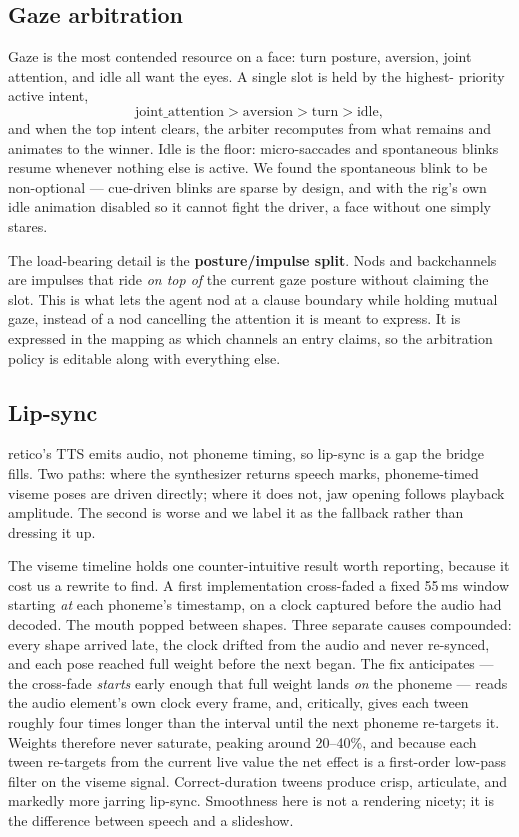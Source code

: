 \documentclass[conference]{IEEEtran}
\begin{document}
\subsection{Gaze arbitration}
\label{sec:arbitration}

Gaze is the most contended resource on a face: turn posture, aversion, joint
attention, and idle all want the eyes. A single slot is held by the highest-
priority active intent,
\[
  \textrm{joint\_attention} > \textrm{aversion} > \textrm{turn} > \textrm{idle},
\]
and when the top intent clears, the arbiter recomputes from what remains and
animates to the winner. Idle is the floor: micro-saccades and spontaneous blinks
resume whenever nothing else is active. We found the spontaneous blink to be
non-optional --- cue-driven blinks are sparse by design, and with the rig's own
idle animation disabled so it cannot fight the driver, a face without one simply
stares.

The load-bearing detail is the \textbf{posture/impulse split}. Nods and
backchannels are impulses that ride \emph{on top of} the current gaze posture
without claiming the slot. This is what lets the agent nod at a clause boundary
while holding mutual gaze, instead of a nod cancelling the attention it is meant
to express. It is expressed in the mapping as which channels an entry claims, so
the arbitration policy is editable along with everything else.

\subsection{Lip-sync}

retico's TTS emits audio, not phoneme timing, so lip-sync is a gap the bridge
fills. Two paths: where the synthesizer returns speech
marks, phoneme-timed viseme poses are driven directly; where it does not, jaw
opening follows playback amplitude. The second is worse and we label it as the
fallback rather than dressing it up.

The viseme timeline holds one counter-intuitive result worth reporting, because
it cost us a rewrite to find. A first implementation cross-faded a fixed 55\,ms
window starting \emph{at} each phoneme's timestamp, on a clock captured before
the audio had decoded. The mouth popped between shapes. Three separate causes
compounded: every shape arrived late, the clock drifted from the audio and never
re-synced, and each pose reached full weight before the next began. The fix
anticipates --- the cross-fade \emph{starts} early enough that full weight lands
\emph{on} the phoneme --- reads the audio element's own clock every frame, and,
critically, gives each tween roughly four times longer than the interval until
the next phoneme re-targets it. Weights therefore never saturate, peaking around
20--40\%, and because each tween re-targets from the current live value the net
effect is a first-order low-pass filter on the viseme signal. Correct-duration
tweens produce crisp, articulate, and markedly more jarring lip-sync. Smoothness
here is not a rendering nicety; it is the difference between speech and a
slideshow.
\end{document}
